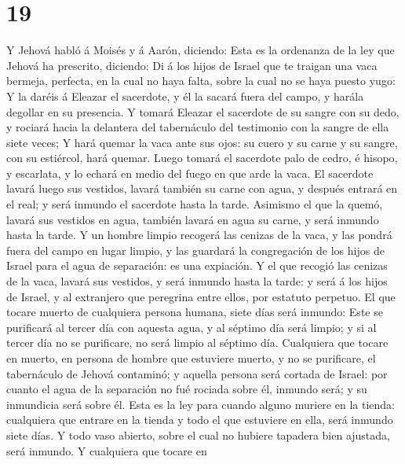 \hypertarget{section-18}{%
\section{19}\label{section-18}}

 Y Jehová habló á Moisés y á Aarón, diciendo:
 Esta es la ordenanza de la ley que Jehová ha prescrito,
diciendo: Di á los hijos de Israel que te traigan una vaca bermeja,
perfecta, en la cual no haya falta, sobre la cual no se haya puesto
yugo:  Y la daréis á Eleazar el sacerdote, y él la sacará
fuera del campo, y harála degollar en su presencia.  Y
tomará Eleazar el sacerdote de su sangre con su dedo, y rociará hacia la
delantera del tabernáculo del testimonio con la sangre de ella siete
veces;  Y hará quemar la vaca ante sus ojos: su cuero y su
carne y su sangre, con su estiércol, hará quemar.  Luego
tomará el sacerdote palo de cedro, é hisopo, y escarlata, y lo echará en
medio del fuego en que arde la vaca.  El sacerdote lavará
luego sus vestidos, lavará también su carne con agua, y después entrará
en el real; y será inmundo el sacerdote hasta la tarde. 
Asimismo el que la quemó, lavará sus vestidos en agua, también lavará en
agua su carne, y será inmundo hasta la tarde.  Y un hombre
limpio recogerá las cenizas de la vaca, y las pondrá fuera del campo en
lugar limpio, y las guardará la congregación de los hijos de Israel para
el agua de separación: es una expiación.  Y el que
recogió las cenizas de la vaca, lavará sus vestidos, y será inmundo
hasta la tarde: y será á los hijos de Israel, y al extranjero que
peregrina entre ellos, por estatuto perpetuo.  El que
tocare muerto de cualquiera persona humana, siete días será inmundo:
 Este se purificará al tercer día con aquesta agua, y al
séptimo día será limpio; y si al tercer día no se purificare, no será
limpio al séptimo día.  Cualquiera que tocare en muerto,
en persona de hombre que estuviere muerto, y no se purificare, el
tabernáculo de Jehová contaminó; y aquella persona será cortada de
Israel: por cuanto el agua de la separación no fué rociada sobre él,
inmundo será; y su inmundicia será sobre él.  Esta es la
ley para cuando alguno muriere en la tienda: cualquiera que entrare en
la tienda y todo el que estuviere en ella, será inmundo siete días.
 Y todo vaso abierto, sobre el cual no hubiere tapadera
bien ajustada, será inmundo.  Y cualquiera que tocare en
